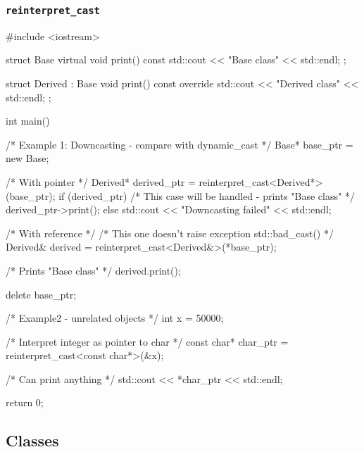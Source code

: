 \documentclass[../main]{subfiles}
\begin{document}
        \subsubsection{\texttt{reinterpret\_cast}}
        \begin{Code}
            #include <iostream>

            struct Base
            {
                virtual void print() const { std::cout << "Base class" << std::endl; }
            };
            
            struct Derived : Base
            {
                void print() const override { std::cout << "Derived class" << std::endl; }
            };
            
            int main() {
                /* Example 1: Downcasting - compare with dynamic_cast */
                Base* base_ptr = new Base;
                
                /* With pointer */
                Derived* derived_ptr = reinterpret_cast<Derived*>(base_ptr);
                if (derived_ptr)
                {
                    /* This case will be handled - prints "Base class" */
                    derived_ptr->print();
                }
                else
                {
                    std::cout << "Downcasting failed" << std::endl;
                }
                
                /* With reference */
                /* This one doesn't raise exception std::bad_cast() */
                Derived& derived = reinterpret_cast<Derived&>(*base_ptr);
                
                /* Prints "Base class" */
                derived.print();
                
                delete base_ptr;
                
                /* Example2 - unrelated objects */
                int x = 50000;
                
                /* Interpret integer as pointer to char */
                const char* char_ptr = reinterpret_cast<const char*>(&x);
                
                /* Can print anything */
                std::cout << *char_ptr << std::endl;
            
                return 0;
            }
        \end{Code}

\subsection{Classes}
\end{document}
